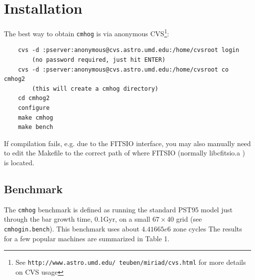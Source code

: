 \documentclass[10pt,dvips]{article}
\begin{document}
{\begin{verbatim}
\end{verbatim}



\section{Installation}

The best way to obtain {\tt cmhog} is via 
anonymous CVS\footnote{See {\tt http://www.astro.umd.edu/~teuben/miriad/cvs.html}
for more details on CVS usage}: 

\begin{verbatim}
	cvs -d :pserver:anonymous@cvs.astro.umd.edu:/home/cvsroot login
		(no password required, just hit ENTER)
	cvs -d :pserver:anonymous@cvs.astro.umd.edu:/home/cvsroot co cmhog2
		(this will create a cmhog directory)
	cd cmhog2
	configure
	make cmhog
	make bench

\end{verbatim}

If compilation fails, e.g. due to the FITSIO interface, you may also manually need to edit
the Makefile to the correct path of where FITSIO (normally libcfitsio.a ) is located.


\newpage
\subsection{Benchmark}

The  {\tt cmhog} benchmark is defined as running the
standard PST95 model just through the bar growth time, 0.1Gyr,
on a small $67 \times 40$ grid (see {\tt cmhogin.bench}). This
benchmark uses about $4.41665e6$ zone cycles
The results for a few popular machines are summarized
in Table 1.

}
\end{document}
